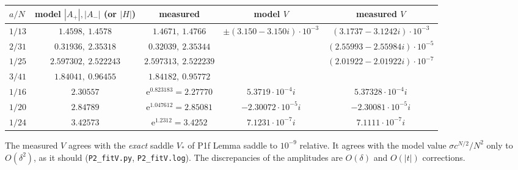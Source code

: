 \documentclass[11pt]{article}
\theoremstyle{remark}\newtheorem{remark}[theorem]{Remark}
\newcommand{\e}{\mathrm{e}}
\begin{document}
\begin{center}\begin{tabular}{lcccc}\toprule
$a/N$ & model $|A_+|,|A_-|$ (or $|H|$) & measured & model $V$ & measured $V$\\\midrule
$1/13$ & $1.4598,\ 1.4578$ & $1.4671,\ 1.4766$ & $\pm(3.150-3.150i)\cdot10^{-3}$ & $(3.1737-3.1242i)\cdot10^{-3}$\\
$2/31$ & $0.31936,\ 2.35318$ & $0.32039,\ 2.35344$ & & $(2.55993-2.55984i)\cdot10^{-5}$\\
$1/25$ & $2.597302,\ 2.522243$ & $2.597313,\ 2.522239$ & & $(2.01922-2.01922i)\cdot10^{-7}$\\
$3/41$ & $1.84041,\ 0.96455$ & $1.84182,\ 0.95772$ & & \\
$1/16$ & $2.30557$ & $\e^{0.823183}=2.27770$ & $5.3719\cdot10^{-4}i$ & $5.37328\cdot10^{-4}i$\\
$1/20$ & $2.84789$ & $\e^{1.047612}=2.85081$ & $-2.30072\cdot10^{-5}i$ & $-2.30081\cdot10^{-5}i$\\
$1/24$ & $3.42573$ & $\e^{1.2312}=3.4252$ & $7.1231\cdot10^{-7}i$ & $7.1111\cdot10^{-7}i$\\\bottomrule
\end{tabular}\end{center}
The measured $V$ agrees with the \emph{exact} saddle $V_*$ of P1f Lemma saddle to $10^{-9}$ relative. It agrees with the model value
$\sigma c^{N/2}/N^2$ only to $O(\delta^2)$, as it should (\texttt{P2\_fitV.py}, \texttt{P2\_fitV.log}). The discrepancies of the amplitudes are
$O(\delta)$ and $O(|t|)$ corrections.
\end{document}
